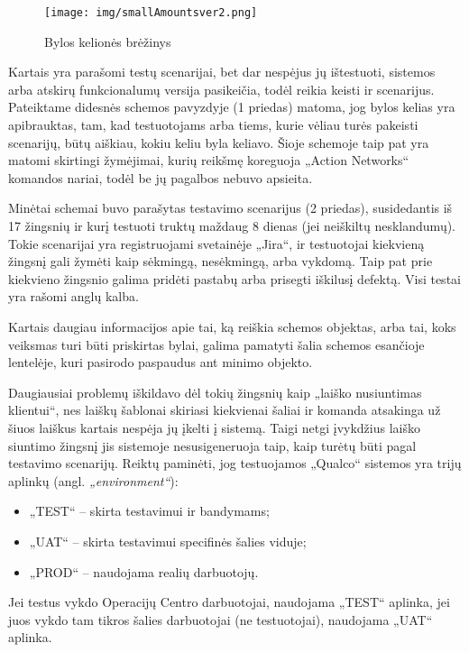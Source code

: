 \documentclass{VUMIFPSkursinis}
\begin{document}
\begin{figure}[H]
    \centering
    \texttt{[image: img/smallAmountsver2.png]}
    \caption{Bylos kelionės brėžinys}
    \label{img:brezinys}
\end{figure}

Kartais yra parašomi testų scenarijai, bet dar nespėjus jų ištestuoti, sistemos arba atskirų funkcionalumų versija pasikeičia, todėl reikia keisti ir scenarijus. Pateiktame didesnės schemos pavyzdyje (1 priedas) matoma, jog bylos kelias yra apibrauktas, tam, kad testuotojams arba tiems, kurie vėliau turės pakeisti scenarijų, būtų aiškiau, kokiu keliu byla keliavo. Šioje schemoje taip pat yra matomi skirtingi žymėjimai, kurių reikšmę koreguoja „Action Networks“ komandos nariai, todėl be jų pagalbos nebuvo apsieita. 

Minėtai schemai buvo parašytas testavimo scenarijus (2 priedas), susidedantis iš 17 žingsnių ir kurį testuoti truktų maždaug 8 dienas (jei neiškiltų nesklandumų). Tokie scenarijai yra registruojami svetainėje „Jira“, ir testuotojai kiekvieną žingsnį gali žymėti kaip sėkmingą, nesėkmingą, arba vykdomą. Taip pat prie kiekvieno žingsnio galima pridėti pastabų arba prisegti iškilusį defektą. Visi testai yra rašomi anglų kalba.

Kartais daugiau informacijos apie tai, ką reiškia schemos objektas, arba tai, koks veiksmas turi būti priskirtas bylai, galima pamatyti šalia schemos esančioje lentelėje, kuri pasirodo paspaudus ant minimo objekto.

Daugiausiai problemų iškildavo dėl tokių žingsnių kaip „laiško nusiuntimas klientui“, nes laiškų šablonai skiriasi kiekvienai šaliai ir komanda atsakinga už šiuos laiškus kartais nespėja jų įkelti į sistemą. Taigi netgi įvykdžius laiško siuntimo žingsnį jis sistemoje nesusigeneruoja taip, kaip turėtų būti pagal testavimo scenarijų. Reiktų paminėti, jog testuojamos „Qualco“ sistemos yra trijų aplinkų (angl. \emph{„environment“}): 
\begin{itemize}
    \item „TEST“ -- skirta testavimui ir bandymams;
    \item „UAT“ -- skirta testavimui specifinės šalies viduje;
    \item „PROD“ -- naudojama realių darbuotojų.
\end{itemize}
Jei testus vykdo Operacijų Centro darbuotojai, naudojama „TEST“ aplinka, jei juos vykdo tam tikros šalies darbuotojai (ne testuotojai), naudojama „UAT“ aplinka.
\end{document}
